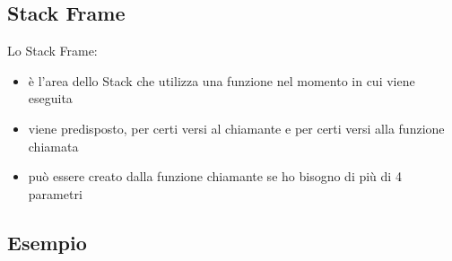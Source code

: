 \documentclass[../main.tex]{subfiles}
\begin{document}
\newpage

\subsection{Stack Frame}
Lo Stack Frame:
\begin{itemize}
    \item è l'area dello Stack che utilizza una funzione nel
    momento in cui viene eseguita
    \item viene predisposto, per certi versi al chiamante
    e per certi versi alla funzione chiamata
    \item può essere creato dalla funzione chiamante se ho
    bisogno di più di 4 parametri
\end{itemize}

\subsection*{Esempio}
\end{document}
